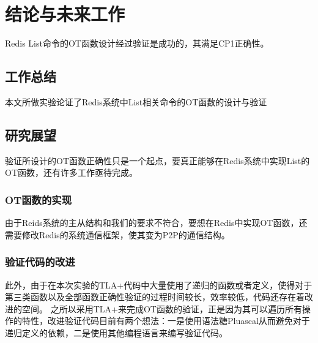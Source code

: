 \chapter{结论与未来工作}
\par Redis List命令的OT函数设计经过验证是成功的，其满足CP1正确性。
\section{工作总结}
本文所做实验论证了Redis系统中List相关命令的OT函数的设计与验证
\section{研究展望}
验证所设计的OT函数正确性只是一个起点，要真正能够在Redis系统中实现List的OT函数，还有许多工作亟待完成。
\subsection{OT函数的实现}
由于Reids系统的主从结构和我们的要求不符合，要想在Redis中实现OT函数，还需要修改Redis的系统通信框架，使其变为P2P的通信结构。
\subsection{验证代码的改进}
此外，由于在本次实验的TLA+代码中大量使用了递归的函数或者定义，使得对于第三类函数以及全部函数正确性验证的过程时间较长，效率较低，代码还存在着改进的空间。
之所以采用TLA+来完成OT函数的验证，正是因为其可以遍历所有操作的特性，改进验证代码目前有两个想法：一是使用语法糖Pluascal从而避免对于递归定义的依赖，二是使用其他编程语言来编写验证代码。